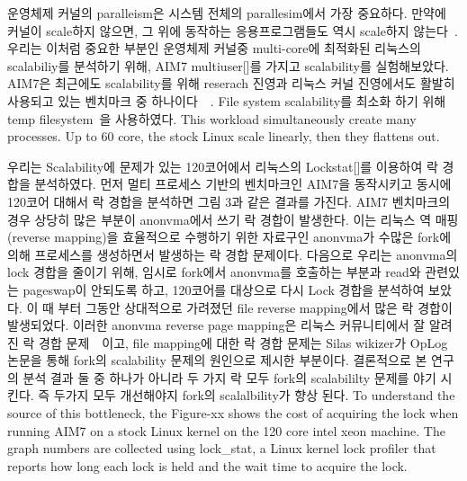\ifkor

운영체제 커널의 paralleism은 시스템 전체의 parallesim에서 가장 중요하다. 
만약에 커널이 scale하지 않으면, 그 위에 동작하는 응용프로그램들도 역시 scale하지 않는다~\cite{Clements15SCR}.
우리는 이처럼 중요한 부분인 운영체제 커널중 multi-core에 최적화된 리눅스의 scalabiliy를 분석하기 위해, AIM7
multiuser[]를 가지고 scalability를 실험해보았다.
AIM7은 최근에도 scalability를 위해 reserach 진영과 리눅스 커널 진영에서도 활발히 사용되고 있는 벤치마크 중
하나이다~\cite{Bueso2015STP}~\cite{Bueso2014MCS}.
File system scalability를 최소화 하기 위해 temp filesystem~\cite{Rohland2001Tempfs}을
사용하였다.
This workload simultaneously create many processes.
Up to 60 core, the stock Linux scale linearly, then they flattens out.
\else


\fi


\ifkor
우리는 Scalability에 문제가 있는 120코어에서 리눅스의 Lockstat[]를 이용하여 락 경합을 분석하였다. 
먼저 멀티 프로세스 기반의 벤치마크인 AIM7을 동작시키고 동시에 120코어 대해서 락 경합을 분석하면 
그림 3과 같은 결과를 가진다. 
AIM7 벤치마크의 경우 상당히 많은 부분이 anonvma에서 쓰기 락 경합이 발생한다. 
이는 리눅스 역 매핑(reverse mapping)을 효율적으로 수행하기 위한 자료구인 anonvma가
수많은 fork에 의해 프로세스를 생성하면서 발생하는 락 경합 문제이다. 
다음으로 우리는 anonvma의 lock 경합을 줄이기 위해, 임시로 fork에서 anonvma를 호출하는 부분과 read와
관련있는 pageswap이 안되도록 하고, 120코어를 대상으로 다시 Lock 경합을 분석하여 보았다.
이 때 부터 그동안 상대적으로 가려졌던 file reverse mapping에서 많은 락 경합이 발생되었다. 
이러한 anonvma reverse page mapping은 리눅스 커뮤니티에서 잘 알려진 락 경합
문제~\cite{Andi2011adding}~\cite{Tim2013adding}이고, file mapping에 대한 락 경합 문제는
Silas wikizer가 OpLog 논문을 통해 fork의 scalability 문제의 원인으로 제시한 부분이다.
결론적으로 본 연구의 분석 결과 둘 중 하나가 아니라 두 가지 락 모두 fork의 scalabililty 문제를 야기 시킨다.
즉 두가지 모두 개선해야지 fork의 scalalbility가 향상 된다. 
\else
To understand the source of this bottleneck, the Figure-xx shows the cost
of acquiring the lock when running AIM7 on a stock Linux kernel on the 120 core
intel xeon machine.
The graph numbers are collected using lock\_stat, a Linux kernel lock profiler
that reports how long each lock is held and the wait time to acquire the lock.

